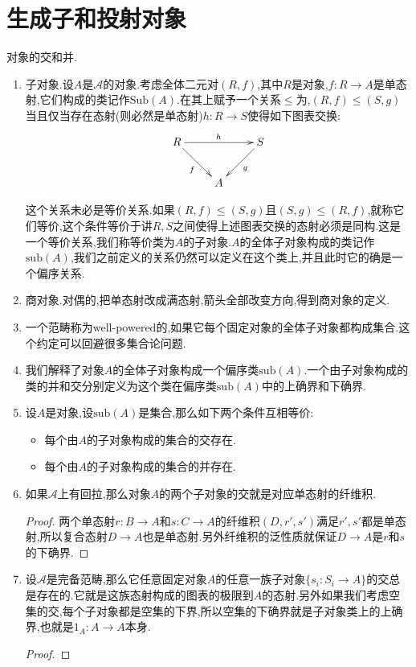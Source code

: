 \section{生成子和投射对象}

对象的交和并.
\begin{enumerate}
	\item 子对象.设$A$是$\mathscr{A}$的对象.考虑全体二元对$(R,f)$,其中$R$是对象,$f:R\to A$是单态射,它们构成的类记作$\mathrm{Sub}(A)$.在其上赋予一个关系$\le$为,$(R,f)\le(S,g)$当且仅当存在态射(则必然是单态射)$h:R\to S$使得如下图表交换:
	$$\xymatrix{R\ar[dr]_{f}\ar[rr]^{h}&&S\ar[dl]^{g}\\&A&}$$
	
	这个关系未必是等价关系.如果$(R,f)\le(S,g)$且$(S,g)\le(R,f)$,就称它们等价,这个条件等价于讲$R,S$之间使得上述图表交换的态射必须是同构.这是一个等价关系,我们称等价类为$A$的子对象.$A$的全体子对象构成的类记作$\mathrm{sub}(A)$,我们之前定义的关系仍然可以定义在这个类上,并且此时它的确是一个偏序关系.
	\item 商对象.对偶的,把单态射改成满态射,箭头全部改变方向,得到商对象的定义.
	\item 一个范畴称为well-powered的,如果它每个固定对象的全体子对象都构成集合.这个约定可以回避很多集合论问题.
	\item 我们解释了对象$A$的全体子对象构成一个偏序类$\mathrm{sub}(A)$.一个由子对象构成的类的并和交分别定义为这个类在偏序类$\mathrm{sub}(A)$中的上确界和下确界.
	\item 设$A$是对象,设$\mathrm{sub}(A)$是集合,那么如下两个条件互相等价:
	\begin{itemize}
		\item 每个由$A$的子对象构成的集合的交存在.
		\item 每个由$A$的子对象构成的集合的并存在.
	\end{itemize}
	\item 如果$\mathscr{A}$上有回拉,那么对象$A$的两个子对象的交就是对应单态射的纤维积.
	\begin{proof}
		
		两个单态射$r:B\to A$和$s:C\to A$的纤维积$(D,r',s')$满足$r',s'$都是单态射,所以复合态射$D\to A$也是单态射.另外纤维积的泛性质就保证$D\to A$是$r$和$s$的下确界.
	\end{proof}
	\item 设$\mathscr{A}$是完备范畴,那么它任意固定对象$A$的任意一族子对象$\{s_i:S_i\to A\}$的交总是存在的.它就是这族态射构成的图表的极限到$A$的态射.另外如果我们考虑空集的交,每个子对象都是空集的下界,所以空集的下确界就是子对象类上的上确界,也就是$1_A:A\to A$本身.
	\begin{proof}
		

\end{proof}
\end{enumerate}
